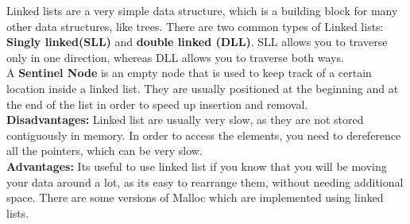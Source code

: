 \documentclass[a4paper]{article}
\begin{document}
Linked lists are a very simple data structure, which is a building block for many other data structures, like trees. There are two common types of Linked lists: {\bf Singly linked(SLL)} and {\bf double linked (DLL)}. SLL allows you to traverse only in one direction, whereas DLL allows you to traverse both ways.  \\
A {\bf Sentinel Node} is an empty node that is used to keep track of a certain location inside a linked list. They are usually positioned at the beginning and at the end of the list in order to speed up insertion and removal. \\
{\bf Disadvantages:} Linked list are usually very slow, as they are not stored contiguously in memory. In order to access the elements, you need to dereference all the pointers, which can be very slow. \\
{\bf Advantages:} Its useful to use linked list if you know that you will be moving your data around a lot, as its easy to rearrange them, without needing additional space. There are some versions of Malloc which are implemented using linked lists.
\end{document}
